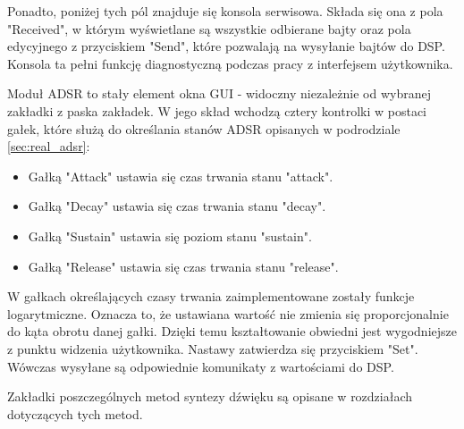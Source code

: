 Ponadto, poniżej tych pól znajduje się konsola serwisowa. Składa się ona z pola "Received", w którym wyświetlane są wszystkie odbierane bajty oraz pola edycyjnego z przyciskiem "Send", które pozwalają na wysyłanie bajtów do DSP. Konsola ta pełni funkcję diagnostyczną podczas pracy z interfejsem użytkownika.

Moduł ADSR to stały element okna GUI - widoczny niezależnie od wybranej zakładki z paska zakładek. W jego skład wchodzą cztery kontrolki w postaci gałek, które służą do określania stanów ADSR opisanych w podrodziale \ref{sec:real_adsr}:
\begin{itemize}
	\item Gałką "Attack" ustawia się czas trwania stanu "attack".
	\item Gałką "Decay" ustawia się czas trwania stanu "decay".
	\item Gałką "Sustain" ustawia się poziom stanu "sustain".
	\item Gałką "Release" ustawia się czas trwania stanu "release".
\end{itemize}
W gałkach określających czasy trwania zaimplementowane zostały funkcje logarytmiczne. Oznacza to, że ustawiana wartość nie zmienia się proporcjonalnie do kąta obrotu danej gałki. Dzięki temu kształtowanie obwiedni jest wygodniejsze z punktu widzenia użytkownika. Nastawy zatwierdza się przyciskiem "Set". Wówczas wysyłane są odpowiednie komunikaty z wartościami do DSP.

Zakładki poszczególnych metod syntezy dźwięku są opisane w rozdziałach dotyczących tych metod.